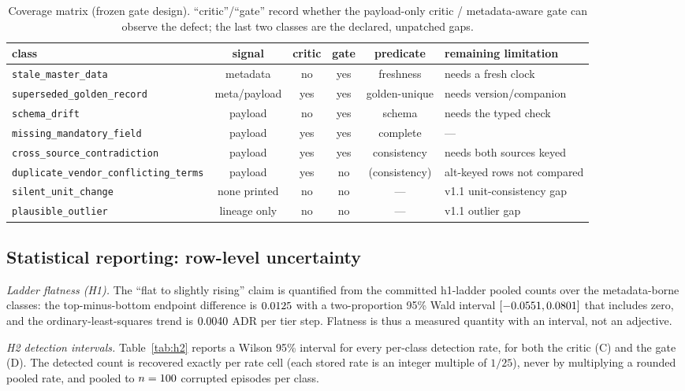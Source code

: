 \documentclass[11pt]{article}
\theoremstyle{plain}
\theoremstyle{definition}
\begin{document}
\begin{table}[t]\centering\small
\setlength{\tabcolsep}{4pt}
\begin{tabular}{@{}lccccl@{}}
\toprule
class & signal & critic & gate & predicate & remaining limitation \\
\midrule
\texttt{stale\_master\_data}        & metadata & no  & yes & freshness    & needs a fresh clock \\
\texttt{superseded\_golden\_record} & meta/payload & yes & yes & golden-unique & needs version/companion \\
\texttt{schema\_drift}              & payload  & no  & yes & schema       & needs the typed check \\
\texttt{missing\_mandatory\_field}  & payload  & yes & yes & complete     & --- \\
\texttt{cross\_source\_contradiction} & payload & yes & yes & consistency & needs both sources keyed \\
\texttt{duplicate\_vendor\_conflicting\_terms} & payload & yes & no & (consistency) & alt-keyed rows not compared \\
\texttt{silent\_unit\_change}       & none printed & no & no & --- & v1.1 unit-consistency gap \\
\texttt{plausible\_outlier}         & lineage only & no & no & --- & v1.1 outlier gap \\
\bottomrule
\end{tabular}
\caption{Coverage matrix (frozen gate design). ``critic''/``gate'' record whether the
payload-only critic / metadata-aware gate can observe the defect; the last two classes are the
declared, unpatched gaps.}
\label{tab:coverage}
\end{table}

\subsection{Statistical reporting: row-level uncertainty}
\emph{Ladder flatness (H1).} The ``flat to slightly rising'' claim is quantified from the
committed h1-ladder pooled counts over the metadata-borne classes: the top-minus-bottom
endpoint difference is $0.0125$ with a two-proportion 95\% Wald interval
$[-0.0551,0.0801]$ that includes zero, and the ordinary-least-squares
trend is $0.0040$ ADR per tier step. Flatness is thus a measured quantity with an
interval, not an adjective.

\emph{H2 detection intervals.} Table~\ref{tab:h2} reports a Wilson 95\% interval for every
per-class detection rate, for both the critic (C) and the gate (D). The detected count is
recovered exactly per rate cell (each stored rate is an integer multiple of $1/25$), never by
multiplying a rounded pooled rate, and pooled to $n=100$ corrupted episodes per class.
\end{document}

